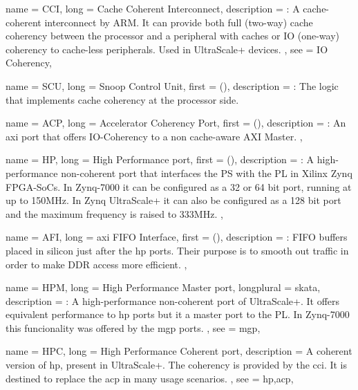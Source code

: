 {
	name = {CCI},
	long = {Cache Coherent Interconnect},
	description = {\emph{}:
		A cache-coherent interconnect by ARM. 
		It can provide both full (two-way) cache coherency between the processor and
		a peripheral with caches or IO (one-way) coherency to cache-less
		peripherals. Used in UltraScale+ devices.
	},
	see = {IO Coherency},
}


{
	name = {SCU},
	long = {Snoop Control Unit},
	first = { ()},
	description = {\emph{}:
		The logic that implements cache coherency at the processor side.
	}
}

{
	name = {ACP},
	long = {Accelerator Coherency Port},
	first = { ()},
	description = {\emph{}:
		An \gls{axi} port that offers IO-Coherency to a non cache-aware AXI Master.
	},
}


{
	name = {HP},
	long = {High Performance port},
	first = { ()},
	description = {\emph{}:
		A high-performance non-coherent port that interfaces 
		the PS with the PL in Xilinx Zynq FPGA-SoCs.
		In Zynq-7000 it can be configured as a 32 or 64 bit port, running at up to 150MHz.
		In Zynq UltraScale+ it can also be configured as a 128 bit port and the maximum
		frequency is raised to 333MHz.
	},
}

{
	name = {AFI},
	long = {\gls{axi} FIFO Interface},
	first = { ()},
	description = {\emph{}:
		FIFO buffers placed in silicon just after the \gls{hp} ports. 
		Their purpose is to smooth out traffic in order to make DDR access more efficient.
	},
}

{
	name = {HPM},
	long = {High Performance Master port},
	longplural = {skata},
	description = {\emph{}:
		A high-performance non-coherent port of UltraScale+. 
		It offers equivalent performance to \gls{hp} ports but it a master port to the PL.
		In Zynq-7000 this funcionality was offered by the \gls{mgp} ports.
	},
	see = {mgp},
}

{
	name = {HPC},
	long = {High Performance Coherent port},
	description = {
		A coherent version of \gls{hp}, present in UltraScale+.
		The coherency is provided by the \gls{cci}.
		It is destined to replace the \gls{acp} in many usage scenarios.
	},
	see = {hp,acp},
}


